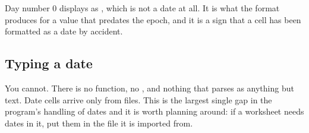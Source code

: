 Day number 0 displays as , which is not a date at all. It is
what the format produces for a value that predates the epoch, and it is a sign
that a cell has been formatted as a date by accident.

\subsection{Typing a date}

You cannot. There is no  function, no , and nothing that
parses  as anything but text. Date cells arrive only from
files. This is the largest single gap in the program's handling of dates and it
is worth planning around: if a worksheet needs dates in it, put them in the
file it is imported from.
